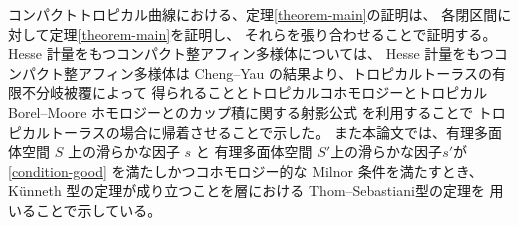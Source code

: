 \documentclass[a4paper,dvipdfmx,reqno,12pt]{amsart}
\theoremstyle{definition}
\numberwithin{equation}{section}
\begin{document}
コンパクトトロピカル曲線における、定理\ref{theorem-main}の証明は、
各閉区間に対して定理\ref{theorem-main}を証明し、
それらを張り合わせることで証明する。
Hesse 計量をもつコンパクト整アフィン多様体については、
Hesse 計量をもつコンパクト整アフィン多様体は Cheng--Yau
の結果\cite{MR714338}より、トロピカルトーラスの有限不分岐被覆によって
得られることとトロピカルコホモロジーとトロピカル Borel--Moore
ホモロジーとのカップ積に関する射影公式
\cite{gross2019sheaftheoretic}を利用することで
トロピカルトーラスの場合に帰着させることで示した。
また本論文では、有理多面体空間 $S$ 上の滑らかな因子 $s$ と
有理多面体空間 $S'$上の滑らかな因子$s'$が\cref{condition-good}
を満たしかつコホモロジー的な Milnor 条件を満たすとき、
K\"unneth 型の定理が成り立つことを層における
Thom--Sebastiani型の定理\cite{MR2031639}を
用いることで示している。



\end{document}
